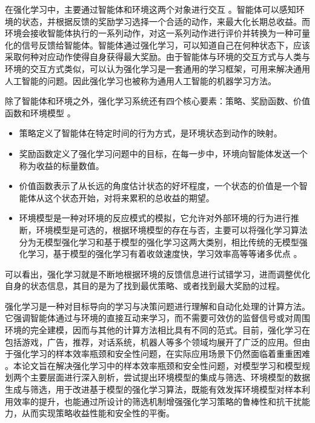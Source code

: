 在强化学习中，主要通过智能体和环境这两个对象进行交互 \cite{tan1993multi}。智能体可以感知环境的状态，并根据反馈的奖励学习选择一个合适的动作，来最大化长期总收益。而环境会接收智能体执行的一系列动作，对这一系列动作进行评价并转换为一种可量化的信号反馈给智能体。智能体通过强化学习，可以知道自己在何种状态下，应该采取何种对应动作使得自身获得最大奖励。由于智能体与环境的交互方式与人类与环境的交互方式类似，可以认为强化学习是一套通用的学习框架，可用来解决通用人工智能的问题。因此强化学习也被称为通用人工智能的机器学习方法\cite{shoham2003multi}。 

除了智能体和环境之外，强化学习系统还有四个核心要素：策略、奖励函数、价值函数和环境模型 \cite{szepesvari2010algorithms}。

\begin{itemize}
    \item 策略定义了智能体在特定时间的行为方式，是环境状态到动作的映射。
    
    \item 奖励函数定义了强化学习问题中的目标，在每一步中，环境向智能体发送一个称为收益的标量数值。

    \item 价值函数表示了从长远的角度估计状态的好坏程度，一个状态的价值是一个智能体从这个状态开始，对将来累积的总收益的期望。

    \item 环境模型是一种对环境的反应模式的模拟，它允许对外部环境的行为进行推断，环境模型是可选的，根据环境模型的存在与否，主要可以将强化学习算法分为无模型强化学习和基于模型的强化学习这两大类别，相比传统的无模型强化学习，基于模型的强化学习有着收敛速度快，学习效率高等等诸多优点 \cite{polydoros2017survey}。
\end{itemize}

可以看出，强化学习就是不断地根据环境的反馈信息进行试错学习，进而调整优化自身的状态信息，其目的是为了找到最优策略、或者找到最大奖励的过程。

强化学习是一种对目标导向的学习与决策问题进行理解和自动化处理的计算方法。它强调智能体通过与环境的直接互动来学习，而不需要可效仿的监督信号或对周围环境的完全建模，因而与其他的计算方法相比具有不同的范式。目前，强化学习在包括游戏，广告，推荐，对话系统，机器人等多个领域均展开了广泛的应用。但由于强化学习的样本效率瓶颈和安全性问题，在实际应用场景下仍然面临着重重困难 \cite{kober2013reinforcement}。本论文旨在解决强化学习中的样本效率瓶颈和安全性问题，对模型学习和模型规划两个主要层面进行深入剖析，尝试提出环境模型的集成与筛选、环境模型的数据生成与筛选，用于改进基于模型的强化学习算法，既能有效发挥环境模型对样本利用效率的提升，也能通过所设计的筛选机制增强强化学习策略的鲁棒性和抗干扰能力，从而实现策略收益性能和安全性的平衡。

